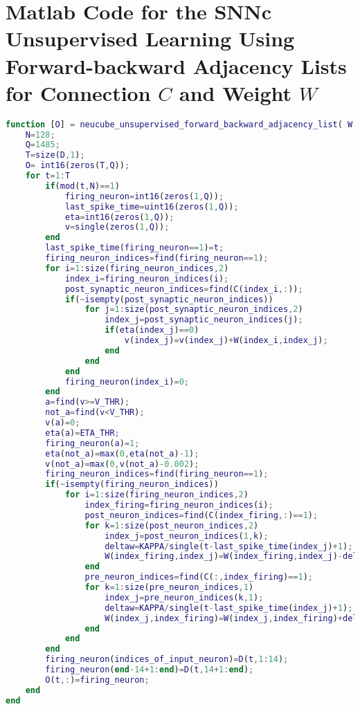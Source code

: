 \section{Matlab Code for the SNNc Unsupervised Learning Using Forward-backward Adjacency Lists for Connection \texorpdfstring{$C$}{Lg} and Weight \texorpdfstring{$W$}{Lg}}
\begin{lstlisting}[language=Matlab, caption={Matlab code for SNNc unsupervised learning algorithm using forward-backward adjacency list data structure for storing connection C and weight W}]
function [O] = neucube_unsupervised_forward_backward_adjacency_list( W,C,D,indices_of_input_neuron, V_THR, ETA_THR, KAPPA )
	N=128;
	Q=1485;
	T=size(D,1);
	O= int16(zeros(T,Q));
	for t=1:T
		if(mod(t,N)==1)
			firing_neuron=int16(zeros(1,Q));
			last_spike_time=uint16(zeros(1,Q));
			eta=int16(zeros(1,Q));
			v=single(zeros(1,Q));
		end
		last_spike_time(firing_neuron==1)=t;
		firing_neuron_indices=find(firing_neuron==1);
		for i=1:size(firing_neuron_indices,2)
			index_i=firing_neuron_indices(i);
			post_synaptic_neuron_indices=find(C(index_i,:));
			if(~isempty(post_synaptic_neuron_indices))
				for j=1:size(post_synaptic_neuron_indices,2)
					index_j=post_synaptic_neuron_indices(j); 
					if(eta(index_j)==0)                
						v(index_j)=v(index_j)+W(index_i,index_j);
					end   
				end
			end
			firing_neuron(index_i)=0;  
		end
		a=find(v>=V_THR);
		not_a=find(v<V_THR);
		v(a)=0;
		eta(a)=ETA_THR;
		firing_neuron(a)=1;
		eta(not_a)=max(0,eta(not_a)-1);
		v(not_a)=max(0,v(not_a)-0.002); 
		firing_neuron_indices=find(firing_neuron==1);
		if(~isempty(firing_neuron_indices))
			for i=1:size(firing_neuron_indices,2)
				index_firing=firing_neuron_indices(i);  
				post_neuron_indices=find(C(index_firing,:)==1);
				for k=1:size(post_neuron_indices,2)
					index_j=post_neuron_indices(1,k);
					deltaw=KAPPA/single(t-last_spike_time(index_j)+1);
					W(index_firing,index_j)=W(index_firing,index_j)-deltaw;           
				end
				pre_neuron_indices=find(C(:,index_firing)==1);
				for k=1:size(pre_neuron_indices,1)
					index_j=pre_neuron_indices(k,1);
					deltaw=KAPPA/single(t-last_spike_time(index_j)+1);
					W(index_j,index_firing)=W(index_j,index_firing)+deltaw; 
				end
			end      
		end
		firing_neuron(indices_of_input_neuron)=D(t,1:14);
		firing_neuron(end-14+1:end)=D(t,14+1:end);
		O(t,:)=firing_neuron;
	end
end
\end{lstlisting}
